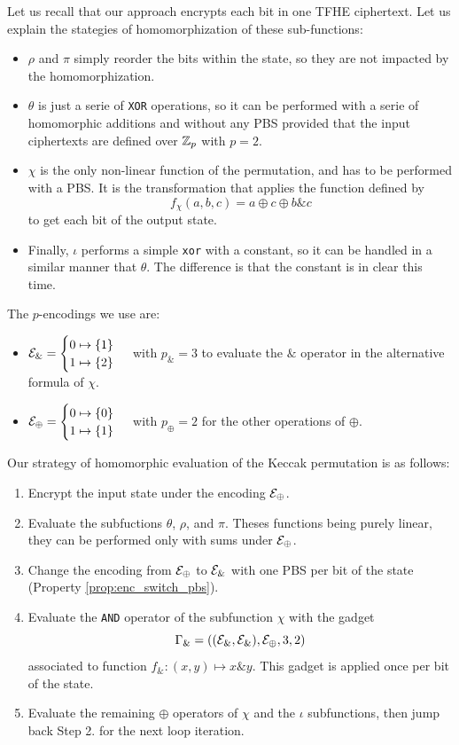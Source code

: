 Let us recall that our approach encrypts each bit in one TFHE ciphertext. Let us explain the stategies of homomorphization of these sub-functions:
\begin{itemize}
    \item $\rho$ and $\pi$ simply reorder the bits within the state, so they are not impacted by the homomorphization.
    \item $\theta$ is just a serie of \texttt{XOR} operations, so it can be performed with a serie of homomorphic additions and without any PBS provided that the input ciphertexts are defined over $\mathbb{Z}_p$ with $p=2$.
    \item $\chi$ is the only non-linear function of the permutation, and has to be performed with a PBS. It is the transformation that applies the function defined by $$f_\chi(a, b, c) = a \oplus c \oplus b \& c$$ to get each bit of the output state.
    \item Finally, $\iota$ performs a simple \texttt{xor} with a constant, so it can be handled in a similar manner that $\theta$. The difference is that the constant is in clear this time.
\end{itemize}
The $p$-encodings we use are:
\begin{itemize}
    \item $\mathcal{E}_{\&} = \begin{cases} 0 \mapsto \{1\} \\ 1 \mapsto \{2\} \end{cases}$ with $p_\& = 3$  to evaluate the $\&$ operator in the alternative formula of $\chi$.
    \item $\mathcal{E}_\oplus = \begin{cases} 0 \mapsto \{0\} \\ 1 \mapsto \{1\} \end{cases}$ with $p_\oplus = 2$ for the other operations of $\oplus$.
\end{itemize}
Our strategy of homomorphic evaluation of the Keccak permutation is as follows:
\begin{enumerate}
    \item Encrypt the input state under the encoding $\mathcal{E}_\oplus$.
    \item Evaluate the subfuctions $\theta$, $\rho$, and $\pi$. Theses functions being purely linear, they can be performed only with sums under $\mathcal{E}_\oplus$.
    \item Change the encoding from $\mathcal{E}_\oplus$ to $\mathcal{E}_\&$ with one PBS per bit of the state (Property \ref{prop:enc_switch_pbs}).
    \item Evaluate the \texttt{AND} operator of the subfunction $\chi$ with the gadget \[\Gamma_\& = \left ( (\mathcal{E}_\&, \mathcal{E}_\&), \mathcal{E}_\oplus, 3, 2\right )\] associated to function $f_\& : (x, y) \mapsto x \& y$. This gadget is applied once per bit of the state.
    \item Evaluate the remaining $\oplus$ operators of $\chi$ and the $\iota$ subfunctions, then jump back Step 2. for the next loop iteration.
\end{enumerate}


